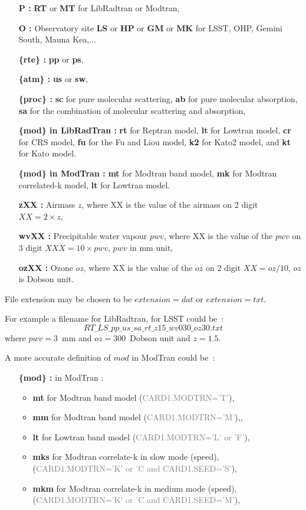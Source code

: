 \documentclass[a4paper]{article}
\begin{document}
\begin{itemize}
\item [{\bf P :} ] {\bf RT} or {\bf MT} for LibRadtran or Modtran,
\item [{\bf O :} ]  Observatory site {\bf LS} or {\bf HP}  or {\bf GM}  or {\bf MK} for LSST, OHP, Gemini South, Mauna Kea,...
\item [{\bf \{rte\} :}] {\bf pp} or  {\bf ps},
\item [{\bf \{atm\} :}]  {\bf us} or {\bf sw},
\item [{\bf \{proc\} :}] {\bf sc} for pure molecular scattering, {\bf ab} for pure molecular absorption, {\bf sa} for the combination of molecular scattering and absorption,
\item [{\bf \{mod\} in LibRadTran :}] {\bf rt} for Reptran model, {\bf lt} for Lowtran model, {\bf cr} for CRS model,  {\bf fu} for the Fu and Liou model, {\bf k2} for Kato2 model, and {\bf kt} for Kato model.
\item [{\bf \{mod\} in ModTran :}] {\bf mt} for Modtran band model, {\bf mk} for Modtran correlated-k model, {\bf lt} for Lowtran model.
\item [{\bf zXX :} ] Airmass $z$, where XX is the value of the airmass on 2 digit $XX=2\times z$,
\item [{\bf wvXX :} ] Precipitable water vapour $pwv$, where XX is the value of the $pwv$ on 3 digit $XXX=10\times pwv$, $pwv$ in mm unit,
\item [{\bf ozXX :} ] Ozone $oz$, where XX is the value of the $oz$ on 2 digit $XX=oz/10$, $oz$ is Dobson unit.
\end{itemize}

File extension may be chosen to be $extension=dat$ or $extension=txt$.

For example a filename for LibRadtran, for LSST could be~:
\begin{equation}
RT\_LS\_pp\_us\_sa\_rt\_z15\_wv030\_oz30.txt  \nonumber
\end{equation}
where $pwv=3$~mm and $oz=300$~Dobson unit and $z=1.5$.

A more accurate definition of ${mod}$ in ModTran could be~:
\begin{itemize}
\item [{\bf \{mod\} :}] in ModTran : 
\begin{itemize}
 \item {\bf mt} for Modtran band model (\textcolor{gray}{CARD1.MODTRN='T'}), 
 \item {\bf mm} for Modtran band model (\textcolor{gray}{CARD1.MODTRN='M'}),, 
 \item {\bf lt} for Lowtran band model (\textcolor{gray}{CARD1.MODTRN='L' or 'F'}), 
 \item {\bf mks} for Modtran correlate-k in slow mode (speed), (\textcolor{gray}{CARD1.MODTRN='K' or 'C and CARD1.SEED='S'}), 
 \item {\bf mkm} for Modtran correlate-k in medium mode (speed), (\textcolor{gray}{CARD1.MODTRN='K' or 'C and CARD1.SEED='M'}),
 \end{itemize}
\end{itemize}
\end{document}
